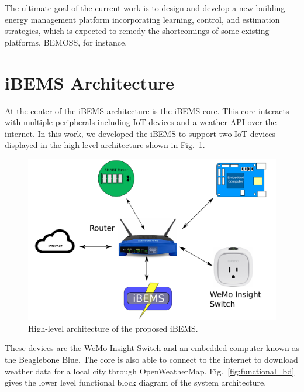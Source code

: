 \documentclass[conference]{IEEEtran}
\begin{document}
The ultimate goal of the current work is to design and develop a new building energy management
platform incorporating learning, control, and estimation strategies, which is expected to remedy the
shortcomings of some existing platforms, BEMOSS, for instance.

\section{iBEMS Architecture}
\label{sec:iBEMS-Architecture}

At the center of the iBEMS architecture is the iBEMS core. This core interacts
with multiple peripherals including IoT devices and a weather API over the
internet. In this work, we developed the iBEMS to support two IoT devices displayed in the high-level architecture shown in Fig.~\ref{fig:highLevelArchitecture}. %
%
\begin{figure}[htbp]
  \centering
  \includegraphics[scale=0.15]{figs/overallConnectionDiagram.pdf}
  \caption{High-level architecture of the proposed iBEMS.}
  \label{fig:highLevelArchitecture}
\end{figure}
%
These devices are the WeMo Insight Switch and an embedded computer known as the Beaglebone
Blue.  The core is also able to
connect to the internet to download weather data for a local city through
OpenWeatherMap. Fig.~\ref{fig:functional_bd} gives the lower level functional block diagram of the system
architecture. %
%
\end{document}
